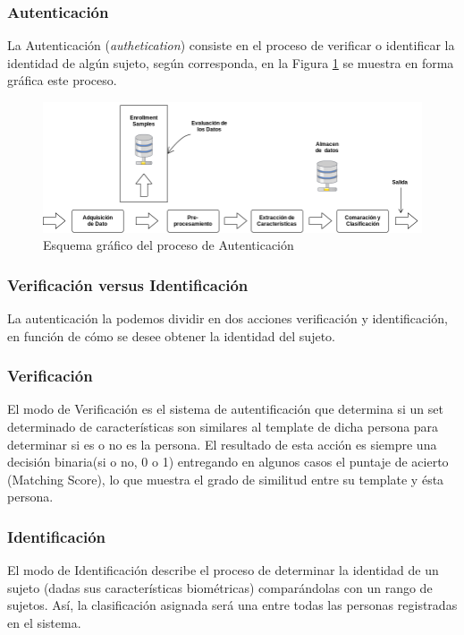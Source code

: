 \subsubsection*{Autenticación}

La Autenticación (\textit{authetication}) consiste en el proceso de verificar o identificar la identidad de algún sujeto, según corresponda,  en la Figura \ref{autenticacion} se muestra en forma gráfica este proceso.

\begin{figure}[H]
\centering
\includegraphics[scale=0.5]{images/capitulo2/autenticacion.png}
\caption{Esquema gráfico del proceso  de Autenticación}
\label{autenticacion}
\end{figure}


\subsubsection{Verificación versus Identificación}

La autenticación la podemos dividir en dos acciones verificación y identificación, en función de cómo se desee obtener la identidad del sujeto.

\subsubsection*{Verificación}
El modo de Verificación es el sistema de autentificación que determina si un set determinado de características son similares al template de dicha persona para determinar si es o no es la persona. El resultado de esta acción es siempre una decisión binaria(si o no, 0 o 1) entregando en algunos casos el puntaje de acierto (Matching Score), lo que muestra el grado de similitud entre su template y ésta persona.

\subsubsection*{Identificación}

El modo de Identificación describe el proceso de determinar la identidad de un sujeto (dadas sus características biométricas) comparándolas con un rango de sujetos. Así, la clasificación asignada será una entre todas las personas registradas en el sistema.



